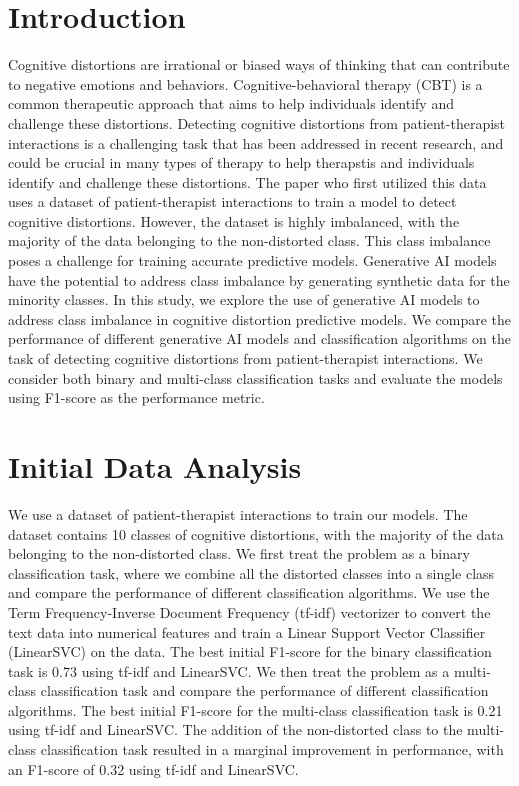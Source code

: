 \documentclass[a0,landscape]{a0poster}
\begin{document}
\begin{multicols}{4}
\color{Teal}

\section*{Introduction}
\color{Black}

Cognitive distortions are irrational or biased ways of thinking that can contribute to negative emotions and behaviors. 
Cognitive-behavioral therapy (CBT) is a common therapeutic approach that aims to help individuals identify and challenge these distortions.
Detecting cognitive distortions from patient-therapist interactions is a challenging task that has been addressed in recent research, and could be crucial in many types of therapy to help therapstis and individuals identify and challenge these distortions.
The paper who first utilized this data\cite{original_paper} uses a dataset of patient-therapist interactions to train a model to detect cognitive distortions.
However, the dataset is highly imbalanced, with the majority of the data belonging to the non-distorted class.
This class imbalance poses a challenge for training accurate predictive models.
Generative AI models have the potential to address class imbalance by generating synthetic data for the minority classes.
In this study, we explore the use of generative AI models to address class imbalance in cognitive distortion predictive models.
We compare the performance of different generative AI models and classification algorithms on the task of detecting cognitive distortions from patient-therapist interactions.
We consider both binary and multi-class classification tasks and evaluate the models using F1-score as the performance metric.

\color{Teal}
\section*{Initial Data Analysis}
\color{Black}

We use a dataset of patient-therapist interactions to train our models.
The dataset contains 10 classes of cognitive distortions, with the majority of the data belonging to the non-distorted class.
We first treat the problem as a binary classification task, where we combine all the distorted classes into a single class and compare the performance of 
different classification algorithms.
We use the Term Frequency-Inverse Document Frequency (tf-idf) vectorizer to convert the text data into numerical features and train a 
Linear Support Vector Classifier (LinearSVC) on the data.
The best initial F1-score for the binary classification task is 0.73 using tf-idf and LinearSVC.
We then treat the problem as a multi-class classification task and compare the performance of different classification algorithms.
The best initial F1-score for the multi-class classification task is 0.21 using tf-idf and LinearSVC.
The addition of the non-distorted class to the multi-class classification task resulted in a marginal improvement in performance, 
with an F1-score of 0.32 using tf-idf and LinearSVC.



\end{multicols}
\end{document}
